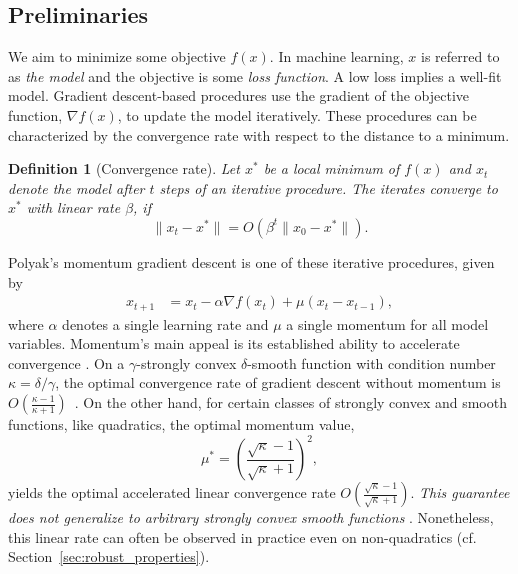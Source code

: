 \documentclass{article} %
\newtheorem{definition}[theorem]{Definition}
\begin{document}


\subsection{Preliminaries}
\label{sec:robust_preliminaries}
We aim to minimize some objective $f(x)$.
In machine learning, $x$ is referred to as {\em the model} and the objective is some {\em loss function}.
A low loss implies a well-fit model.
Gradient descent-based procedures use the gradient of the objective function, $\nabla f(x)$, to update the model iteratively.
These procedures can be characterized by the convergence rate with respect to the distance to a minimum.
\begin{definition} [Convergence rate]
	Let $x^*$ be a local minimum of $f(x)$ and $x_t$ denote the model after $t$ steps of an iterative procedure. %
The iterates converge to $x^*$ with linear rate $\beta$,
	if \[ \| x_{t} - x^* \| = O(\beta^t \| x_0 - x^* \|).\]
\end{definition}
Polyak's momentum gradient descent \citep{polyak1964some} is one of these iterative procedures, given by
\begin{align}
	x_{t+1}  &= x_t - \alpha \nabla f(x_t) + \mu (x_t - x_{t-1}),
	\label{eqn:momentum_gd}
\end{align} 
where $\alpha$ denotes a single learning rate and $\mu$ a single momentum for all model variables.   
Momentum's main appeal is its established ability to {accelerate convergence} \citep{polyak1964some}. 
On a $\gamma$-strongly convex $\delta$-smooth function with condition number $\kappa=\delta/\gamma$, the optimal convergence rate of gradient descent without momentum
is $O(\frac{\kappa-1}{\kappa+1})$~\citep{nesterov2013introductory}.
On the other hand, for certain classes of strongly convex and smooth functions, like quadratics,
 the optimal momentum value,
\begin{equation}
	\mu^* = \left(\frac{\sqrt{\kappa}-1}{\sqrt{\kappa}+1}\right)^2,
	\label{eqn:optimal_momentum}
\end{equation}
yields the optimal accelerated linear convergence rate $O(\frac{\sqrt{\kappa}-1}{\sqrt{\kappa}+1})$.
{\em This guarantee does not generalize to arbitrary strongly convex smooth functions} \citep{lessard2016analysis}.
Nonetheless, this linear rate can often be observed in practice even on non-quadratics (cf. Section~\ref{sec:robust_properties}).
\end{document}
